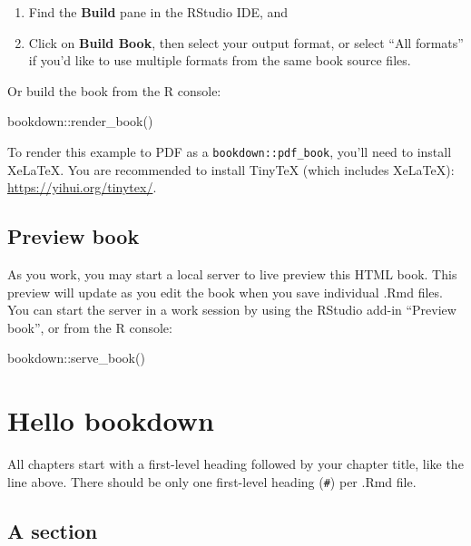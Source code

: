 \documentclass[
]{book}
\newenvironment{Shaded}{\begin{snugshade}}{\end{snugshade}}
\newcommand{\FunctionTok}[1]{\textcolor[rgb]{0.00,0.00,0.00}{#1}}
\newcommand{\NormalTok}[1]{#1}
\newcommand{\SpecialCharTok}[1]{\textcolor[rgb]{0.00,0.00,0.00}{#1}}
\theoremstyle{definition}
\theoremstyle{definition}
\theoremstyle{definition}
\theoremstyle{definition}
\theoremstyle{remark}
\begin{document}
\begin{enumerate}
\def\labelenumi{\arabic{enumi}.}
\item
  Find the \textbf{Build} pane in the RStudio IDE, and
\item
  Click on \textbf{Build Book}, then select your output format, or select ``All formats'' if you'd like to use multiple formats from the same book source files.
\end{enumerate}

Or build the book from the R console:

\begin{Shaded}
\begin{Highlighting}[]
\NormalTok{bookdown}\SpecialCharTok{::}\FunctionTok{render\_book}\NormalTok{()}
\end{Highlighting}
\end{Shaded}

To render this example to PDF as a \texttt{bookdown::pdf\_book}, you'll need to install XeLaTeX. You are recommended to install TinyTeX (which includes XeLaTeX): \url{https://yihui.org/tinytex/}.

\hypertarget{preview-book}{%
\subsection{Preview book}\label{preview-book}}

As you work, you may start a local server to live preview this HTML book. This preview will update as you edit the book when you save individual .Rmd files. You can start the server in a work session by using the RStudio add-in ``Preview book'', or from the R console:

\begin{Shaded}
\begin{Highlighting}[]
\NormalTok{bookdown}\SpecialCharTok{::}\FunctionTok{serve\_book}\NormalTok{()}
\end{Highlighting}
\end{Shaded}

\hypertarget{hello-bookdown}{%
\section{Hello bookdown}\label{hello-bookdown}}

All chapters start with a first-level heading followed by your chapter title, like the line above. There should be only one first-level heading (\texttt{\#}) per .Rmd file.

\hypertarget{a-section}{%
\subsection{A section}\label{a-section}}
\end{document}
